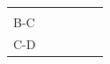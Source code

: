 {{\begin{center}
\begin{tabular}[t]{|l|l|l|l|l|l|}
         &
         &
         &
     \tabularnewline\cline{1-1}\cline{2-2}\cline{3-3}\cline{4-4}\cline{5-5}\cline{6-6}
        B-C &
         &
         &
         &
         &
     \tabularnewline\cline{1-1}\cline{2-2}\cline{3-3}\cline{4-4}\cline{5-5}\cline{6-6}
        C-D &

\end{tabular}
\end{center}}}
